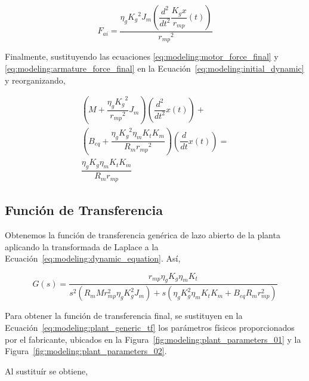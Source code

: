 \documentclass[12pt,a4paper]{article}
\begin{document}
        \begin{equation}
          F_{ai} = \dfrac{\eta_{g} {K_{g}}^{2}  J_{m} \left(\dfrac{d^{2}}{dt^{2}} \dfrac{K_{g} x}{r_{mp}} \left(t\right)\right)}{{r_{mp}}^{2}}
          \label{eq:modeling:armature_force_final}
        \end{equation}

        Finalmente, sustituyendo las ecuaciones \ref{eq:modeling:motor_force_final} y \ref{eq:modeling:armature_force_final}
        en la Ecuación~\ref{eq:modeling:initial_dynamic} y reorganizando, 

        \begin{multline}
          \left( M + \dfrac{\eta_{g} {K_{g}}^{2}}{{r_{mp}}^{2}} J_{m} \right) \left( \dfrac{d^{2}}{dt^{2}} x \left(t\right) \right) + \\
          \left( B_{eq} + \dfrac{\eta_{g} {K_{g}}^{2} \eta_{m} K_{t} K_{m}}{R_{m} {r_{mp}}^{2}} \right) \left(\dfrac{d}{dt} x\left(t\right)\right) = \\
          \dfrac{\eta_{g} K_{g} \eta_{m} K_{t} K_{m}}{R_{m} r_{mp}}
          \label{eq:modeling:dynamic_equation}
        \end{multline}

      \subsection{Función de Transferencia}

        Obtenemos la función de transferencia genérica de lazo abierto de la planta aplicando la transformada de Laplace a 
        la Ecuación~\ref{eq:modeling:dynamic_equation}. Así, 
      
        \begin{equation}
          G\left(s\right) = \frac{r_{mp} \eta_{g} K_{g} \eta_{m} K_{t}}{s^{2} \left(R_{m} M r_{mp}^{2} \eta_{g} K_{g}^{2} J_{m}\right) + 
          s\left(\eta_{g} K_{g}^{2} \eta_{m} K_{t} K_{m} + B_{eq} R_{m} r_{mp}^{2}\right)}
          \label{eq:modeling:plant_generic_tf}
        \end{equation}

        Para obtener la función de transferencia final, se sustituyen en la Ecuación~\ref{eq:modeling:plant_generic_tf}
        los parámetros físicos proporcionados por el fabricante, ubicados en la 
        Figura~\ref{fig:modeling:plant_parameters_01} y la Figura~\ref{fig:modeling:plant_parameters_02}.

        Al sustituír se obtiene, 
\end{document}
